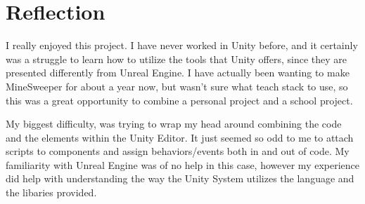 \section{Reflection}
\label{sec:Reflection}

I really enjoyed this project.
I have never worked in Unity before, and it certainly was a struggle to learn how to utilize the tools that Unity offers, since they are presented differently from Unreal Engine.
I have actually been wanting to make MineSweeper for about a year now, but wasn't sure what teach stack to use, so this was a great opportunity to combine a personal project and a school project.

My biggest difficulty, was trying to wrap my head around combining the code and the elements within the Unity Editor.
It just seemed so odd to me to attach scripts to components and assign behaviors/events both in and out of code.
My familiarity with Unreal Engine was of no help in this case, however my experience did help with understanding the way the Unity System utilizes the language and the libaries provided.

